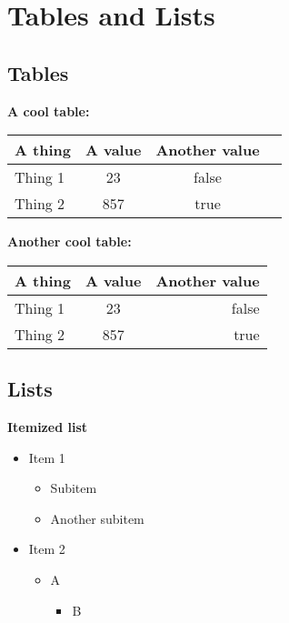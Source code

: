 
\section{Tables and Lists} %
\label{sec:tables_and_lists}

\subsection{Tables} %
\label{sub:tables}

\textbf{A cool table:} \par

\begin{center}
	\begin{tabular}[H]{l*{3}{c}}
		\hline
		A thing & A value & Another value \\
		\hline
		Thing 1 & 23 & false \\
		Thing 2 & 857 & true \\
		\hline
	\end{tabular}
\end{center}

\par

\textbf{Another cool table:}\par

\begin{center}
	\begin{tabular}[H]{l | c | r}
		\hline
		A thing & A value & Another value \\
		\hline
		Thing 1 & 23 & false \\
		Thing 2 & 857 & true \\
		\hline
	\end{tabular}
\end{center}


\subsection{Lists} %
\label{sub:lists}

\textbf{Itemized list}

\begin{itemize}
	\item Item 1
		\begin{itemize}
			\item Subitem
			\item Another subitem
		\end{itemize}
	\item Item 2
		\begin{itemize}
			\item A
				\begin{itemize}
					\item B
				\end{itemize}
		\end{itemize}
\end{itemize}

